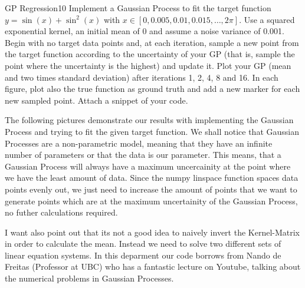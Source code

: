 \newif\ifvimbug
\vimbugfalse

\ifvimbug

\fi

\begin{questions}


\begin{question}{GP Regression}{10}
Implement a Gaussian Process to fit the target function $y = \sin(x) + \sin^2(x)$ with $x \in [0, 0.005, 0.01, 0.015, \ldots, 2\pi]$. Use a squared exponential kernel, an initial mean of 0 and assume a noise variance of 0.001. Begin with no target data points and, at each iteration, sample a new point from the target function according to the uncertainty of your GP (that is, sample the point where the uncertainty is the highest) and update it. Plot your GP (mean and two times standard deviation) after iterations 1, 2, 4, 8 and 16.
In each figure, plot also the true function as ground truth and add a new marker for each new sampled point. Attach a snippet of your code.

\begin{answer}
The following pictures demonstrate our results with implementing the Gaussian Process and trying to fit the given target function. We shall notice that Gaussian Processes are a non-parametric model, meaning that they have an infinite number of parameters or that the data is our parameter. This means, that a Gaussian Process will always have a maximum uncercainity at the point where we have the least amount of data. Since the numpy linspace function spaces data points evenly out, we just need to increase the amount of points that we want to generate points which are at the maximum uncertainity of the Gaussian Process, no futher calculations required. 

I want also point out that its not a good idea to naively invert the Kernel-Matrix in order to calculate the mean. Instead we need to solve two different sets of linear equation systems. In this deparment our code borrows from Nando de Freitas (Professor at UBC) who has a fantastic lecture on Youtube, talking about the numerical problems in Gaussian Processes.
\end{answer}


\end{question}
\end{questions}
